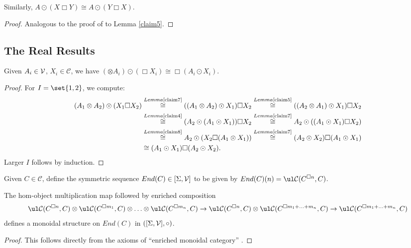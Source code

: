 \documentclass{report}
\renewcommand{\C}{\text{$\mathcal{C}$}}
\begin{document}
\begin{appendices}
\begin{lemma}
  \label{claim8}
Similarly, $A\odot(X\Box Y)\cong A\odot(Y\Box X)$.
\end{lemma}
\begin{proof}
  Analogous to the proof of to Lemma \ref{claim5}.
\end{proof}

\subsection{The Real Results}

\begin{prop}
  \label{lemma1}
Given $A_i\in\text{$\mathcal{V}$}$, $X_i\in \C$, we have $(\otimes A_i)\odot (\Box X_i) \cong \Box(A_i\odot X_i)$.
\end{prop}
\begin{proof}
  For $I = \set{1,2}$, we compute:
  \begin{align*}
    (A_1\otimes A_2)\odot(X_1\Box X_2) &\overset{\scriptsize{Lemma \ref{claim7}}}{\cong} ((A_1\otimes A_2)\odot X_1)\Box X_2 
    \overset{\scriptsize{Lemma \ref{claim5}}}{\cong}((A_2\otimes A_1)\odot X_1)\Box X_2\\
    &\overset{\scriptsize{Lemma \ref{claim4}}}{\cong}(A_2\odot (A_1\odot X_1))\Box X_2 
    \overset{\scriptsize{Lemma \ref{claim7}}}{\cong}A_2\odot((A_1\odot X_1)\Box X_2)\\
    &\overset{\scriptsize{Lemma \ref{claim8}}}{\cong}A_2\odot(X_2\Box (A_1\odot X_1))
    \overset{\scriptsize{Lemma \ref{claim7}}}{\cong}(A_2\odot X_2)\Box (A_1\odot X_1)\\
    &\cong (A_1\odot X_1)\Box (A_2\odot X_2).
  \end{align*}
Larger $I$ follows by induction.
\end{proof}

Given $C\in\C$, define the symmetric sequence $End(C)\in [\Sigma,\text{$\mathcal{V}$}]$ to be given by $End(C)(n) = \ul\C(C^{\Box n},C)$.

\begin{prop}
  \label{lemma2}
  The hom-object multiplication map followed by enriched composition
\[\ul\C(C^{\Box n},C)\otimes\ul\C(C^{\Box m_1},C)\otimes\ldots\otimes \ul\C(C^{\Box m_n},C) \to \ul\C(C^{\Box n},C)\otimes \ul\C(C^{\Box m_1+\ldots+m_n},C)\to \ul\C(C^{\Box m_1+\ldots+m_n},C)\]
defines a monoidal structure on $End(C)$ in $([\Sigma,\text{$\mathcal{V}$}],\circ)$. 
\end{prop}
\begin{proof}
  This follows directly from the axioms of ``enriched monoidal category''
.
\end{proof}


\end{appendices}
\end{document}

